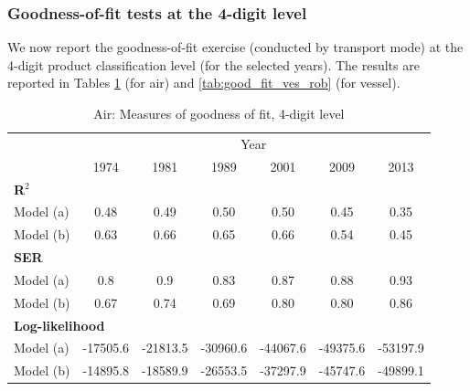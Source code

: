 \documentclass[11pt,twoside, authoryear]{elsarticle}
\begin{document}
\subsubsection{Goodness-of-fit tests at the 4-digit level}

We now report the goodness-of-fit exercise (conducted by transport mode) at the 4-digit product classification level (for the selected years).
The results are reported in Tables \ref{tab:good_fit_air_rob} (for air) and \ref{tab:good_fit_ves_rob} (for vessel).
\begin{table}[htbp]
  \centering
  \caption{Air: Measures of goodness of fit, 4-digit level}
\begin{center}
\label{tab:good_fit_air_rob}%
  \footnotesize{
\begin{tabular}{l|cccccc}
\hline
\hline
      & \multicolumn{6}{c}{Year}              \\
      & \multicolumn{1}{c}{1974} & \multicolumn{1}{c}{1981} & \multicolumn{1}{c}{1989} & \multicolumn{1}{c}{2001} & \multicolumn{1}{c}{2009} & \multicolumn{1}{c}{2013}  \\
\hline
\multicolumn{7}{l}{\textbf{R$^2$}}      \\ \hline
Model (a)& \multicolumn{1}{c}{0.48} & \multicolumn{1}{c}{0.49} & \multicolumn{1}{c}{0.50} & \multicolumn{1}{c}{0.50} & \multicolumn{1}{c}{0.45} & \multicolumn{1}{c}{0.35} \\
Model (b) & \multicolumn{1}{c}{0.63} & \multicolumn{1}{c}{0.66} & \multicolumn{1}{c}{0.65} & \multicolumn{1}{c}{0.66} & \multicolumn{1}{c}{0.54} & \multicolumn{1}{c}{0.45} \\ \hline
\multicolumn{7}{l}{\textbf{SER} }  \\ \hline
Model (a)& \multicolumn{1}{c}{0.8} & \multicolumn{1}{c}{0.9} & \multicolumn{1}{c}{0.83} &   0.87    & \multicolumn{1}{c}{0.88} & \multicolumn{1}{c}{0.93}  \\
Model (b) & \multicolumn{1}{c}{0.67} & \multicolumn{1}{c}{0.74} & \multicolumn{1}{c}{0.69} &  0.80     & \multicolumn{1}{c}{0.80} & \multicolumn{1}{c}{0.86}  \\
\multicolumn{7}{l}{\textbf{Log-likelihood} } \\ \hline
Model (a) & \multicolumn{1}{c}{-17505.6} & \multicolumn{1}{c}{-21813.5} & \multicolumn{1}{c}{-30960.6} & \multicolumn{1}{c}{-44067.6} & \multicolumn{1}{c}{-49375.6} & \multicolumn{1}{c}{-53197.9}  \\
Model (b) & \multicolumn{1}{c}{-14895.8} & \multicolumn{1}{c}{-18589.9} & \multicolumn{1}{c}{-26553.5} & \multicolumn{1}{c}{-37297.9} & \multicolumn{1}{c}{-45747.6} & \multicolumn{1}{c}{-49899.1}  \\ \hline

\end{tabular}}
\end{center}
\end{table}
\end{document}
